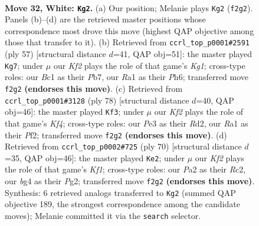 \documentclass[11pt]{article}
\begin{document}
\clearpage

\begin{figure}[p]\centering
\begin{subfigure}{0.46\textwidth}\centering
\resizebox{\linewidth}{!}{%
\newchessgame
\chessboard[
  setfen={1r6/pp4k1/8/2p2rP1/4p1b1/N3P3/PP3K2/R1B5 w - - 1 32},
  showmover=false,
  pgfstyle=straightmove, color=movearrow, markmove={f2-g2}
]}
\caption{}
\end{subfigure}\hfill
\begin{subfigure}{0.46\textwidth}\centering
\resizebox{\linewidth}{!}{%
\newchessgame
\chessboard[
  setfen={2R3k1/1p3p2/5p1p/p3p3/Pb6/8/1r3PPP/R4K2 b - - 1 29},
  showmover=false,
  pgfstyle=straightmove, color=movearrow, markmove={g8-g7}
]}
\caption{}
\end{subfigure}
\\[4pt]
\begin{subfigure}{0.46\textwidth}\centering
\resizebox{\linewidth}{!}{%
\newchessgame
\chessboard[
  setfen={8/8/pp2pk1p/2b5/P3BK1r/1P6/3R1PP1/8 w - - 1 40},
  showmover=false,
  pgfstyle=straightmove, color=movearrow, markmove={f4-f3}
]}
\caption{}
\end{subfigure}\hfill
\begin{subfigure}{0.46\textwidth}\centering
\resizebox{\linewidth}{!}{%
\newchessgame
\chessboard[
  setfen={8/1p4k1/6p1/7p/1p1bp3/1B6/P1R2PPP/3r1K2 w - - 4 36},
  showmover=false,
  pgfstyle=straightmove, color=movearrow, markmove={f1-e2}
]}
\caption{}
\end{subfigure}
\caption{\textbf{Move 32, White: \texttt{Kg2}.} (a) Our position; Melanie plays \texttt{Kg2} (\texttt{f2g2}). Panels (b)--(d) are the retrieved master positions whose correspondence most drove this move (highest QAP objective among those that transfer to it). (b) Retrieved from \texttt{ccrl\_top\_p0001\#2591} (ply 57) [structural distance $d$=41, QAP obj=51]: the master played \texttt{Kg7}; under $\mu$ our \emph{Kf2} plays the role of that game's \emph{Kg1}; cross-type roles: our \emph{B}c1 as their \emph{P}b7, our \emph{R}a1 as their \emph{P}h6; transferred move \texttt{f2g2} \textbf{(endorses this move)}. (c) Retrieved from \texttt{ccrl\_top\_p0001\#3128} (ply 78) [structural distance $d$=40, QAP obj=46]: the master played \texttt{Kf3}; under $\mu$ our \emph{Kf2} plays the role of that game's \emph{Kf4}; cross-type roles: our \emph{P}e3 as their \emph{R}d2, our \emph{R}a1 as their \emph{P}f2; transferred move \texttt{f2g2} \textbf{(endorses this move)}. (d) Retrieved from \texttt{ccrl\_top\_p0002\#725} (ply 70) [structural distance $d$=35, QAP obj=46]: the master played \texttt{Ke2}; under $\mu$ our \emph{Kf2} plays the role of that game's \emph{Kf1}; cross-type roles: our \emph{P}a2 as their \emph{R}c2, our \emph{b}g4 as their \emph{P}g2; transferred move \texttt{f2g2} \textbf{(endorses this move)}. Synthesis: 6 retrieved analogs transferred to \texttt{Kg2} (summed QAP objective 189, the strongest correspondence among the candidate moves); Melanie committed it via the \texttt{search} selector.}
\label{fig:thought-m62}
\end{figure}
\end{document}
